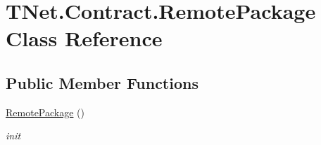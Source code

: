 \hypertarget{class_t_net_1_1_contract_1_1_remote_package}{}\section{T\+Net.\+Contract.\+Remote\+Package Class Reference}
\label{class_t_net_1_1_contract_1_1_remote_package}


 


\subsection*{Public Member Functions}
\begin{DoxyCompactItemize}
\item 
\mbox{\hyperlink{class_t_net_1_1_contract_1_1_remote_package_ae2994f26f6464ca5cc8197d9fcd7c50a}{Remote\+Package}} ()
\begin{DoxyCompactList}\small\item\em init \end{DoxyCompactList}\end{DoxyCompactItemize}
